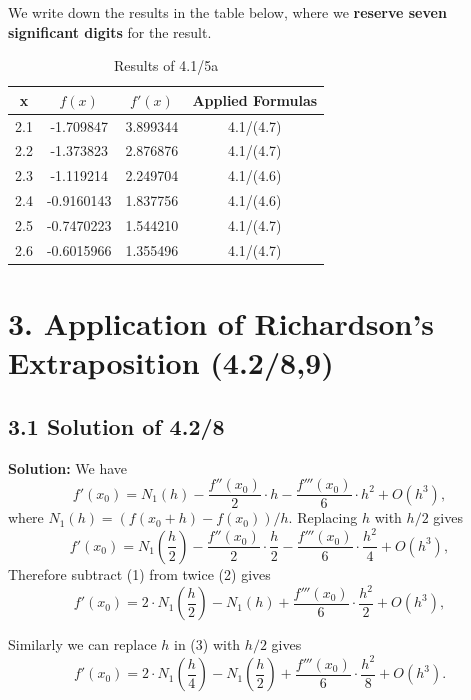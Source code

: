 \documentclass{article}
\begin{document}
    We write down the results in the table below, where we \textbf{reserve seven significant digits} for the result.
    \begin{table}[htbp]
    \centering
    \caption{Results of 4.1/5a}
    \begin{tabular}{c|c|c|c}
    \toprule
    \textbf{x} & \textbf{$f(x)$} & \textbf{$f'(x)$} & \textbf{Applied Formulas} \\ 
    \midrule
    2.1 & -1.709847 & 3.899344 &4.1/(4.7)\\
    2.2 & -1.373823 & 2.876876 &4.1/(4.7)\\
    2.3 & -1.119214 & 2.249704 &4.1/(4.6) \\
    2.4 & -0.9160143 & 1.837756&4.1/(4.6) \\
    2.5 & -0.7470223 & 1.544210&4.1/(4.7)\\
    2.6 & -0.6015966 & 1.355496&4.1/(4.7)\\
    \bottomrule
    \end{tabular}
    \end{table}

\section{3. Application of Richardson's Extraposition (4.2/8,9)}
\subsection{3.1 Solution of 4.2/8}
    \noindent\textbf{Solution:} We have
    \begin{equation}
    f'(x_{0})=N_{1}(h)-\frac{f''(x_{0})}{2}\cdot h
    -\frac{f'''(x_{0})}{6}\cdot h^2+O(h^3),
    \end{equation}
    where $N_{1}(h)=(f(x_{0}+h)-f(x_{0}))/h$. 
    Replacing $h$ with $h/2$ gives 
    \begin{equation}
    f'(x_{0})=N_{1}(\frac{h}{2})-\frac{f''(x_{0})}{2}\cdot \frac{h}{2}
    -\frac{f'''(x_{0})}{6}\cdot \frac{h^2}{4}+O(h^3),
    \end{equation}
    Therefore subtract (1) from twice (2) gives
    \begin{equation}
    f'(x_{0})=2\cdot N_{1}(\frac{h}{2})-N_{1}(h)
    +\frac{f'''(x_{0})}{6}\cdot \frac{h^2}{2}+O(h^3),
    \end{equation}

    Similarly we can replace $h$ in (3) with $h/2$ gives 
    \begin{equation}
    f'(x_{0})=2\cdot N_{1}(\frac{h}{4})-N_{1}(\frac{h}{2})
    +\frac{f'''(x_{0})}{6}\cdot \frac{h^2}{8}+O(h^3).
    \end{equation}
\end{document}
